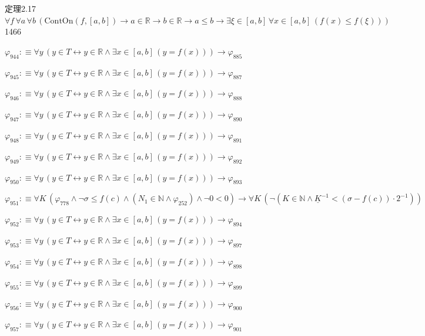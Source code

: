 \begin{fullproof}{定理2.17}{$\forall f\,\forall a\,\forall b\,(\mathrm{ContOn}(f,[a,b]) \to a \in \mathbb{R} \to b \in \mathbb{R} \to a \leq b \to \exists \xi \in [a,b]\,\forall x \in [a,b]\,(f(x) \leq f(\xi)))$}{1466}
\begin{abbrevlist}
\item $\varphi_{944} :\equiv \forall y\,(y \in T \leftrightarrow y \in \mathbb{R} \land \exists x \in [a,b]\,(y = f(x))) \to \varphi_{885}$
\item $\varphi_{945} :\equiv \forall y\,(y \in T \leftrightarrow y \in \mathbb{R} \land \exists x \in [a,b]\,(y = f(x))) \to \varphi_{887}$
\item $\varphi_{946} :\equiv \forall y\,(y \in T \leftrightarrow y \in \mathbb{R} \land \exists x \in [a,b]\,(y = f(x))) \to \varphi_{888}$
\item $\varphi_{947} :\equiv \forall y\,(y \in T \leftrightarrow y \in \mathbb{R} \land \exists x \in [a,b]\,(y = f(x))) \to \varphi_{890}$
\item $\varphi_{948} :\equiv \forall y\,(y \in T \leftrightarrow y \in \mathbb{R} \land \exists x \in [a,b]\,(y = f(x))) \to \varphi_{891}$
\item $\varphi_{949} :\equiv \forall y\,(y \in T \leftrightarrow y \in \mathbb{R} \land \exists x \in [a,b]\,(y = f(x))) \to \varphi_{892}$
\item $\varphi_{950} :\equiv \forall y\,(y \in T \leftrightarrow y \in \mathbb{R} \land \exists x \in [a,b]\,(y = f(x))) \to \varphi_{893}$
\item $\varphi_{951} :\equiv \forall K\,(\varphi_{778} \land \neg \sigma \leq f(c) \land (N_{1} \in \mathbb{N} \land \varphi_{252}) \land \neg 0 < 0) \to \forall K\,(\neg (K \in \mathbb{N} \land \underline{K}^{-1} < (\sigma - f(c)) \cdot 2^{-1}))$
\item $\varphi_{952} :\equiv \forall y\,(y \in T \leftrightarrow y \in \mathbb{R} \land \exists x \in [a,b]\,(y = f(x))) \to \varphi_{894}$
\item $\varphi_{953} :\equiv \forall y\,(y \in T \leftrightarrow y \in \mathbb{R} \land \exists x \in [a,b]\,(y = f(x))) \to \varphi_{897}$
\item $\varphi_{954} :\equiv \forall y\,(y \in T \leftrightarrow y \in \mathbb{R} \land \exists x \in [a,b]\,(y = f(x))) \to \varphi_{898}$
\item $\varphi_{955} :\equiv \forall y\,(y \in T \leftrightarrow y \in \mathbb{R} \land \exists x \in [a,b]\,(y = f(x))) \to \varphi_{899}$
\item $\varphi_{956} :\equiv \forall y\,(y \in T \leftrightarrow y \in \mathbb{R} \land \exists x \in [a,b]\,(y = f(x))) \to \varphi_{900}$
\item $\varphi_{957} :\equiv \forall y\,(y \in T \leftrightarrow y \in \mathbb{R} \land \exists x \in [a,b]\,(y = f(x))) \to \varphi_{901}$

\end{abbrevlist}
\end{fullproof}
